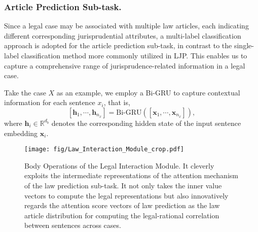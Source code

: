 \subsubsection{Article Prediction Sub-task.}\label{subsubsec: article prediction subtask}
Since a legal case may be associated with multiple law articles, each indicating different corresponding jurisprudential attributes, a multi-label classification approach is adopted for the article prediction sub-task, in contrast to the single-label classification method more commonly utilized in LJP. 
This enables us to capture a comprehensive range of jurisprudence-related information in a legal case.

Take the case $X$ as an example, we employ a Bi-GRU to capture contextual information for each sentence $x_i$, that is,
\[
[\mathbf{h}_1, \cdots, \mathbf{h}_{n_x}] = \text{Bi-GRU}([\mathbf{x}_1, \cdots, \mathbf{x}_{n_x}]),
\]
where $\mathbf{h}_i \in \mathbb{R}^{d_b}$ denotes the corresponding hidden state of the input sentence embedding $\mathbf{x}_i$.

\begin{figure*}[t]
\centering
\texttt{[image: fig/Law\_Interaction\_Module\_crop.pdf]}
\caption{
Body Operations of the Legal Interaction Module.
It cleverly exploits the intermediate representations of the attention mechanism of the law prediction sub-task.
It not only takes the inner value vectors to compute the legal representations but also innovatively regards the attention score vectors of law prediction as the law article distribution for computing the legal-rational correlation between sentences across cases.
}
\label{fig: Law Interaction}
\end{figure*}

